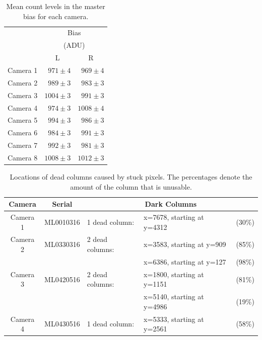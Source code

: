 \begin{colsection}
\begin{colsection}
\newpage

\begin{table}[t]
    \begin{center}
        \begin{tabular}{c|rr} %
             & \multicolumn{2}{c}{Bias} \\
             & \multicolumn{2}{c}{(ADU)} \\
             & \multicolumn{1}{c}{L} & \multicolumn{1}{c}{R} \\
            \midrule
            Camera 1 & $971\pm4$ & $969\pm4$ \\
            Camera 2 & $989\pm3$ & $983\pm3$ \\
            Camera 3 & $1004\pm3$ & $991\pm3$ \\
            Camera 4 & $974\pm3$ & $1008\pm4$ \\
            Camera 5 & $994\pm3$ & $986\pm3$ \\
            Camera 6 & $984\pm3$ & $991\pm3$ \\
            Camera 7 & $992\pm3$ & $981\pm3$ \\
            Camera 8 & $1008\pm3$ & $1012\pm3$ \\
        \end{tabular}
    \end{center}
    \caption[TODO]{
        Mean count levels in the master bias for each camera.
        }\label{tab:bias}
\end{table}

\begin{table}[t]
    \begin{center}
        \begin{tabular}{cc|lll} %
            Camera   & Serial    & \multicolumn{3}{c}{Dark Columns} \\
            \midrule
            Camera 1 & ML0010316 & 1 dead column:  & x=7678, starting at y=4312 & (30\%) \\
            Camera 2 & ML0330316 & 2 dead columns: & x=3583, starting at y=909  & (85\%) \\
                     &           &                 & x=6386, starting at y=127  & (98\%) \\
            Camera 3 & ML0420516 & 2 dead columns: & x=1800, starting at y=1151 & (81\%) \\
                     &           &                 & x=5140, starting at y=4986 & (19\%) \\
            Camera 4 & ML0430516 & 1 dead column:  & x=5333, starting at y=2561 & (58\%) \\
        \end{tabular}
    \end{center}
    \caption[TODO]{
        Locations of dead columns caused by stuck pixels. The percentages denote the amount of the column that is unusable.
    }\label{tab:frame}
\end{table}


\end{colsection}
\end{colsection}
